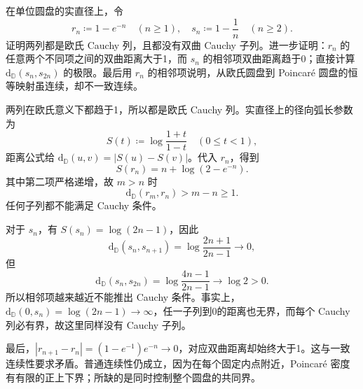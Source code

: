 \begin{exercise}\label{b3:ex:13-3}
在单位圆盘的实直径上，令
\[
 r_n\coloneqq1-e^{-n}\quad(n\ge1),\quad
 s_n\coloneqq1-\frac1n\quad(n\ge2).
\]
证明两列都是欧氏 Cauchy 列，且都没有双曲 Cauchy 子列。进一步证明：\(r_n\) 的任意两个不同项之间的双曲距离大于1，而 \(s_n\) 的相邻项双曲距离趋于0；直接计算 \(\mathrm d_{\mathbb D}(s_n,s_{2n})\) 的极限。最后用 \(r_n\) 的相邻项说明，从欧氏圆盘到 Poincaré 圆盘的恒等映射虽连续，却不一致连续。
\end{exercise}
\begin{solution}
两列在欧氏意义下都趋于1，所以都是欧氏 Cauchy 列。实直径上的径向弧长参数为
\[
 S(t)\coloneqq\log\frac{1+t}{1-t}\quad(0\le t<1),
\]
距离公式给 \(\mathrm d_{\mathbb D}(u,v)=|S(u)-S(v)|\)。代入 \(r_n\)，得到
\[
 S(r_n)=n+\log(2-e^{-n}).
\]
其中第二项严格递增，故 \(m>n\) 时
\[
 \mathrm d_{\mathbb D}(r_m,r_n)>m-n\ge1.
\]
任何子列都不能满足 Cauchy 条件。

对于 \(s_n\)，有 \(S(s_n)=\log(2n-1)\)，因此
\[
 \mathrm d_{\mathbb D}(s_n,s_{n+1})
 =\log\frac{2n+1}{2n-1}\longrightarrow0,
\]
但
\[
 \mathrm d_{\mathbb D}(s_n,s_{2n})
 =\log\frac{4n-1}{2n-1}\longrightarrow\log2>0.
\]
所以相邻项越来越近不能推出 Cauchy 条件。事实上，\(\mathrm d_{\mathbb D}(0,s_n)=\log(2n-1)\rightarrow\infty\)，任一子列到0的距离也无界，而每个 Cauchy 列必有界，故这里同样没有 Cauchy 子列。

最后，\(|r_{n+1}-r_n|=(1-e^{-1})e^{-n}\rightarrow0\)，对应双曲距离却始终大于1。这与一致连续性要求矛盾。普通连续性仍成立，因为在每个固定内点附近，Poincaré 密度有有限的正上下界；所缺的是同时控制整个圆盘的共同界。
\end{solution}

